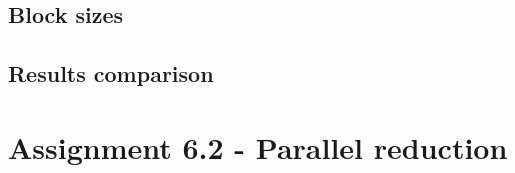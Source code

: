 \documentclass[a4paper]{article}
\begin{document}
	
	
	\subsection{Block sizes}
	
	\subsection{Results comparison}
	
	

\section{Assignment 6.2 - Parallel reduction}
\end{document}
